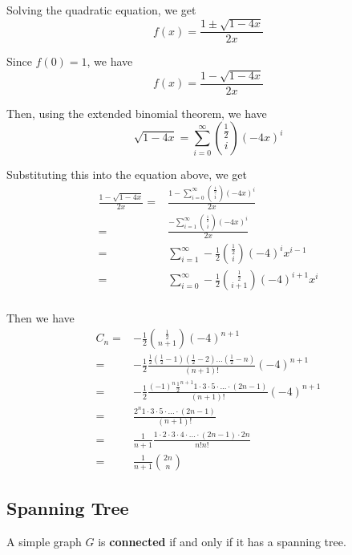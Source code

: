 \documentclass[a4paper,12pt]{article}
\begin{document}
Solving the quadratic equation, we get
\begin{equation*}
	f(x) = \frac{1 \pm \sqrt{1 - 4x}}{2x}
\end{equation*}

Since $f(0) = 1$, we have
\begin{equation*}
	f(x) = \frac{1 - \sqrt{1 - 4x}}{2x}
\end{equation*}

Then, using the extended binomial theorem, we have
\begin{equation*}
	\sqrt{1 - 4x} = \sum_{i=0}^{\infty} \binom{\frac{1}{2}}{i} (-4x)^i
\end{equation*}

Substituting this into the equation above, we get
\begin{align*}
	\frac{1 - \sqrt{1-4x}}{2x} =& \frac{1 - \sum_{i=0}^{\infty} \binom{\frac{1}{2}}{i} (-4x)^i}{2x} \\
	=& \frac{-\sum_{i=1}^{\infty} \binom{\frac{1}{2}}{i} (-4x)^i}{2x} \\
	=& \sum_{i=1}^{\infty} -\frac{1}{2} \binom{\frac{1}{2}}{i} (-4)^i x^{i-1} \\
	=& \sum_{i=0}^{\infty} -\frac{1}{2} \binom{\frac{1}{2}}{i+1} (-4)^{i+1} x^i \\
\end{align*}

Then we have
\begin{align*}
	C_n =& -\frac{1}{2} \binom{\frac{1}{2}}{n+1} (-4)^{n+1} \\
	=& -\frac{1}{2} \frac{\frac{1}{2} (\frac{1}{2} - 1) (\frac{1}{2} - 2) ... (\frac{1}{2} - n)}{(n+1)!} (-4)^{n+1} \\
	=& -\frac{1}{2} \frac{(-1)^n \frac{1}{2}^{n+1} 1 \cdot 3 \cdot 5 \cdot ... \cdot (2n-1)}{(n+1)!} (-4)^{n+1} \\
	=& \frac{2^n 1 \cdot 3 \cdot 5 \cdot ... \cdot (2n-1)}{(n+1)!} \\
	=& \frac{1}{n+1} \frac{1 \cdot 2 \cdot 3 \cdot 4 \cdot ... \cdot (2n-1) \cdot 2n}{n! n!} \\
	=& \frac{1}{n+1} \binom{2n}{n}
\end{align*}

\subsection{Spanning Tree}

A simple graph $G$ is \textbf{connected} if and only if it has a spanning tree.
\end{document}
